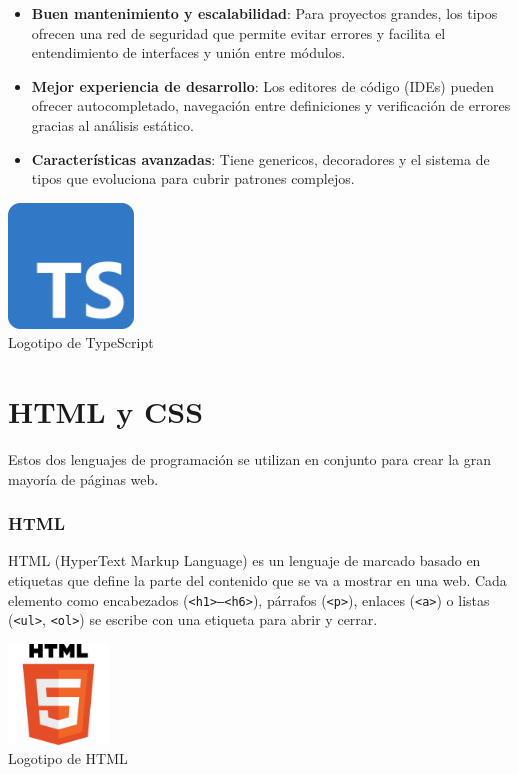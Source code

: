 \begin{itemize}
  \item \textbf{Buen mantenimiento y escalabilidad}:
        Para proyectos grandes, los tipos ofrecen una red de seguridad que permite evitar errores y facilita el entendimiento de interfaces y unión entre módulos.
  \item \textbf{Mejor experiencia de desarrollo}: 
        Los editores de código (IDEs) pueden ofrecer autocompletado, navegación entre definiciones y verificación de errores gracias al análisis estático.
  \item \textbf{Características avanzadas}:
        Tiene genericos, decoradores y el sistema de tipos que evoluciona para cubrir patrones complejos.
\end{itemize}

\begin{center}
  \includegraphics[width=0.25\textwidth]{img/typescript-logo.png}\\
  \small Logotipo de TypeScript
\end{center}


\section{HTML y CSS}\label{html-css}
Estos dos lenguajes de programación se utilizan en conjunto para crear la gran mayoría de páginas web.

\subsubsection{HTML}

HTML (HyperText Markup Language) es un lenguaje de marcado basado en etiquetas que define la parte del contenido que se va a mostrar en una web. Cada elemento como encabezados (\texttt{<h1>–<h6>}), párrafos (\texttt{<p>}), enlaces (\texttt{<a>}) o listas (\texttt{<ul>}, \texttt{<ol>}) se escribe con una etiqueta para abrir y cerrar.

\begin{center}
  \includegraphics[width=0.2\textwidth]{img/html-logo.png}\\
  \small Logotipo de HTML
\end{center}

